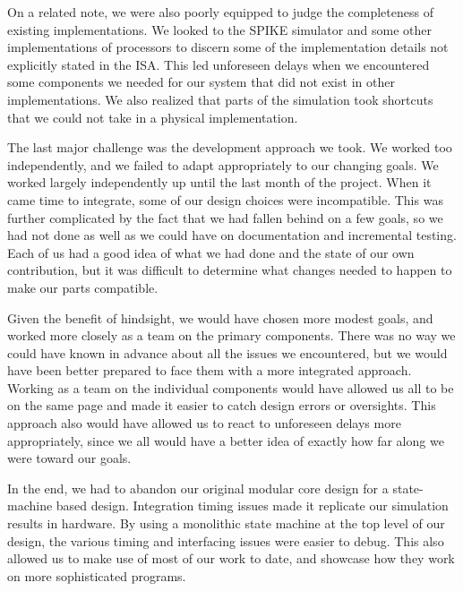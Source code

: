 \documentclass{article}
\begin{document}
On a related note, we were also poorly equipped to judge the completeness of existing implementations.  We looked to the SPIKE simulator and some other implementations of processors to discern some of the implementation details not explicitly stated in the ISA.  This led unforeseen delays when we encountered some components we needed for our system that did not exist in other implementations.  We also realized that parts of the simulation took shortcuts that we could not take in a physical implementation.

The last major challenge was the development approach we took.  We worked too independently, and we failed to adapt appropriately to our changing goals.  We worked largely independently up until the last month of the project.  When it came time to integrate, some of our design choices were incompatible.  This was further complicated by the fact that we had fallen behind on a few goals, so we had not done as well as we could have on documentation and incremental testing.  Each of us had a good idea of what we had done and the state of our own contribution, but it was difficult to determine what changes needed to happen to make our parts compatible.

Given the benefit of hindsight, we would have chosen more modest goals, and worked more closely as a team on the primary components.  There was no way we could have known in advance about all the issues we encountered, but we would have been better prepared to face them with a more integrated approach.  Working as a team on the individual components would have allowed us all to be on the same page and made it easier to catch design errors or oversights.  This approach also would have allowed us to react to unforeseen delays more appropriately, since we all would have a better idea of exactly how far along we were toward our goals.

In the end, we had to abandon our original modular core design for a state-machine based design.  Integration timing issues made it replicate our simulation results in hardware.  By using a monolithic state machine at the top level of our design, the various timing and interfacing issues were easier to debug.  This also allowed us to make use of most of our work to date, and showcase how they work on more sophisticated programs.
\end{document}
